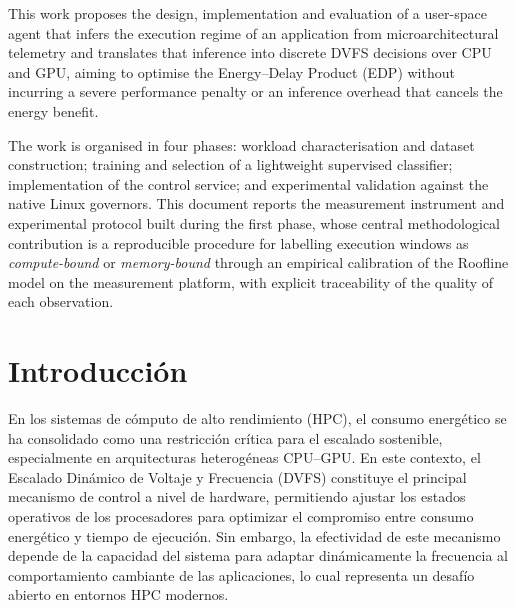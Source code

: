 \documentclass[12pt,oneside,spanish]{book}
\begin{document}
This work proposes the design, implementation and evaluation of a user-space agent that infers the execution regime of an application from microarchitectural telemetry and translates that inference into discrete DVFS decisions over CPU and GPU, aiming to optimise the Energy--Delay Product (EDP) without incurring a severe performance penalty or an inference overhead that cancels the energy benefit.

The work is organised in four phases: workload characterisation and dataset construction; training and selection of a lightweight supervised classifier; implementation of the control service; and experimental validation against the native Linux governors. This document reports the measurement instrument and experimental protocol built during the first phase, whose central methodological contribution is a reproducible procedure for labelling execution windows as \textit{compute-bound} or \textit{memory-bound} through an empirical calibration of the Roofline model on the measurement platform, with explicit traceability of the quality of each observation.


\clearpage
\tableofcontents


\clearpage
\listoftables


\clearpage
\listoffigures


\chapter*{Introducción}
\setcounter{chapter}{0}
\setcounter{equation}{0}
\setcounter{figure}{0}
\setcounter{table}{0}

En los sistemas de cómputo de alto rendimiento (HPC), el consumo energético se ha consolidado como una restricción crítica para el escalado sostenible, especialmente en arquitecturas heterogéneas CPU--GPU. En este contexto, el Escalado Dinámico de Voltaje y Frecuencia (DVFS) constituye el principal mecanismo de control a nivel de hardware, permitiendo ajustar los estados operativos de los procesadores para optimizar el compromiso entre consumo energético y tiempo de ejecución. Sin embargo, la efectividad de este mecanismo depende de la capacidad del sistema para adaptar dinámicamente la frecuencia al comportamiento cambiante de las aplicaciones, lo cual representa un desafío abierto en entornos HPC modernos.
\end{document}
